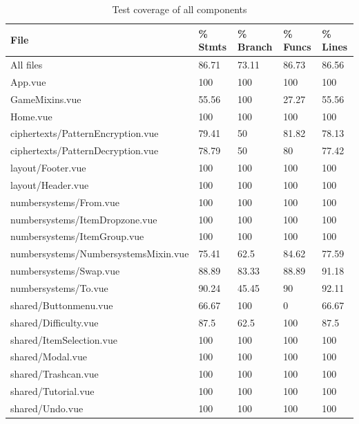 \begin{table}
    \label{table:testCoverage}
    \caption{Test coverage of all components}
    \centering
    \begin{tabular}{|l|l|l|l|l|}
    \hline
        File & \% Stmts & \% Branch & \% Funcs & \% Lines \\ \hline
        All files & 86.71 & 73.11 & 86.73 & 86.56 \\ \hline
        App.vue & 100 & 100 & 100 & 100 \\ \hline
        GameMixins.vue & 55.56 & 100 & 27.27 & 55.56 \\ \hline
        Home.vue & 100 & 100 & 100 & 100 \\ \hline
        ciphertexts/PatternEncryption.vue & 79.41 & 50 & 81.82 & 78.13 \\ \hline
        ciphertexts/PatternDecryption.vue & 78.79 & 50 & 80 & 77.42 \\ \hline
        layout/Footer.vue & 100 & 100 & 100 & 100 \\ \hline
        layout/Header.vue & 100 & 100 & 100 & 100 \\ \hline
        numbersystems/From.vue & 100 & 100 & 100 & 100 \\ \hline
        numbersystems/ItemDropzone.vue & 100 & 100 & 100 & 100 \\ \hline
        numbersystems/ItemGroup.vue & 100 & 100 & 100 & 100 \\ \hline
        numbersystems/NumbersystemsMixin.vue & 75.41 & 62.5 & 84.62 & 77.59 \\ \hline
        numbersystems/Swap.vue & 88.89 & 83.33 & 88.89 & 91.18 \\ \hline
        numbersystems/To.vue & 90.24 & 45.45 & 90 & 92.11 \\ \hline
        shared/Buttonmenu.vue & 66.67 & 100 & 0 & 66.67 \\ \hline
        shared/Difficulty.vue & 87.5 & 62.5 & 100 & 87.5 \\ \hline
        shared/ItemSelection.vue & 100 & 100 & 100 & 100 \\ \hline
        shared/Modal.vue & 100 & 100 & 100 & 100 \\ \hline
        shared/Trashcan.vue & 100 & 100 & 100 & 100 \\ \hline
        shared/Tutorial.vue & 100 & 100 & 100 & 100 \\ \hline
        shared/Undo.vue & 100 & 100 & 100 & 100 \\ \hline

\end{tabular}
\end{table}
